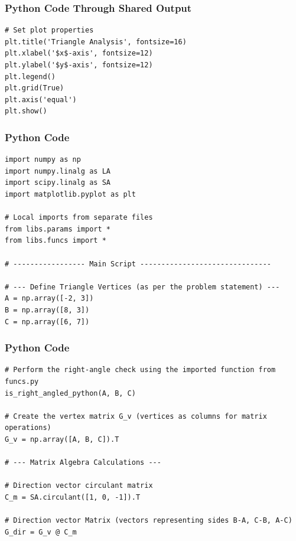 \documentclass{beamer}
\begin{document}
\begin{frame}[fragile]
\frametitle{Python Code Through Shared Output}
\begin{lstlisting}
# Set plot properties
plt.title('Triangle Analysis', fontsize=16)
plt.xlabel('$x$-axis', fontsize=12)
plt.ylabel('$y$-axis', fontsize=12)
plt.legend()
plt.grid(True)
plt.axis('equal')
plt.show()

\end{lstlisting}
\end{frame}   

\begin{frame}[fragile]
\frametitle{Python Code}
\begin{lstlisting}
import numpy as np
import numpy.linalg as LA
import scipy.linalg as SA
import matplotlib.pyplot as plt

# Local imports from separate files
from libs.params import *
from libs.funcs import *

# ----------------- Main Script -------------------------------

# --- Define Triangle Vertices (as per the problem statement) ---
A = np.array([-2, 3])
B = np.array([8, 3])
C = np.array([6, 7])
\end{lstlisting}
\end{frame}  

\begin{frame}[fragile]
\frametitle{Python Code}
\begin{lstlisting}
# Perform the right-angle check using the imported function from funcs.py
is_right_angled_python(A, B, C)

# Create the vertex matrix G_v (vertices as columns for matrix operations)
G_v = np.array([A, B, C]).T

# --- Matrix Algebra Calculations ---

# Direction vector circulant matrix
C_m = SA.circulant([1, 0, -1]).T

# Direction vector Matrix (vectors representing sides B-A, C-B, A-C)
G_dir = G_v @ C_m
\end{lstlisting}
\end{frame}  
\end{document}

